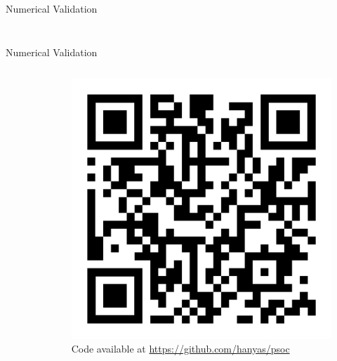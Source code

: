 \documentclass[10pt, aspectratio=1610]{beamer}
\begin{document}
    \begin{frame}{Numerical Validation}
      \begin{columns}
        \begin{column}{0.5\textwidth}
          \begin{figure}[htbp]
            \centering
            
          \end{figure}
        \end{column}
        \begin{column}{0.5\textwidth}
          \begin{figure}[htbp]
            \centering
            
          \end{figure}
        \end{column}
      \end{columns}
    \end{frame}

    \begin{frame}{Numerical Validation}
      \begin{columns}
        \begin{column}{0.5\textwidth}
          \begin{figure}[htbp]
            \centering
            
          \end{figure}
        \end{column}
        \begin{column}{0.5\textwidth}
          \begin{figure}[htbp]
            \centering
            \includegraphics[scale=0.1]{figures/psoc_qr.png}
            \caption{Code available at \url{https://github.com/hanyas/psoc}}
          \end{figure}
        \end{column}
      \end{columns}
    \end{frame}
\end{document}

